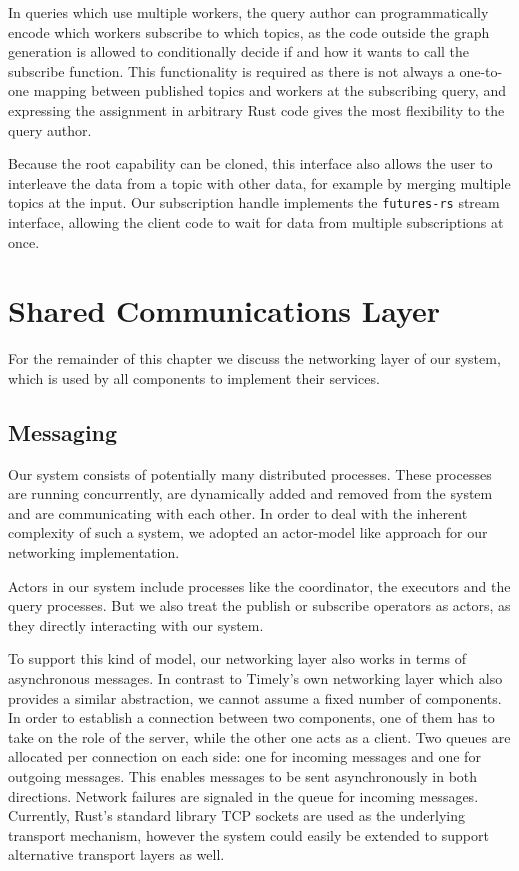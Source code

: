 In queries which use multiple workers, the query author can programmatically
encode which workers subscribe to which topics, as the code outside the
graph generation is allowed to conditionally decide if and how it wants to call
the subscribe function. This functionality is required as there is not
always a one-to-one mapping between published topics and workers at the
subscribing query, and expressing the assignment in arbitrary Rust code
gives the most flexibility to the query author.

Because the root capability can be cloned, this interface also allows the user to
interleave the data from a topic with other data, for example by merging
multiple topics at the input. Our subscription handle implements the
\lstinline{futures-rs} stream interface, allowing the client code to wait for
data from multiple subscriptions at once.

\clearpage
\section{Shared Communications Layer}

For the remainder of this chapter we discuss the networking layer of our system,
which is used by all components to implement their services.

\subsection{Messaging}

Our system consists of potentially many distributed processes. These processes
are running concurrently, are dynamically added and removed from the system
and are communicating with each other. In order to deal with the inherent
complexity of such a system, we adopted an actor-model like approach for our
networking implementation.

Actors in our system include processes like the coordinator, the executors 
and the query processes. But we also treat the publish or subscribe operators
as actors, as they directly interacting with our system.

To support this kind of model, our networking layer also works in terms of
asynchronous messages. In contrast to Timely's own networking layer which also
provides a similar abstraction, we cannot assume a fixed number of components.
In order to establish a connection between two components, one of them has to
take on the role of the server, while the other one acts as a client. Two
queues are allocated per connection on each side: one for incoming messages
and one for outgoing messages. This enables messages to be sent asynchronously
in both directions. Network failures are signaled in the queue for incoming
messages. Currently, Rust's standard library TCP sockets are used as the
underlying transport mechanism, however the system could easily be extended to
support alternative transport layers as well.

